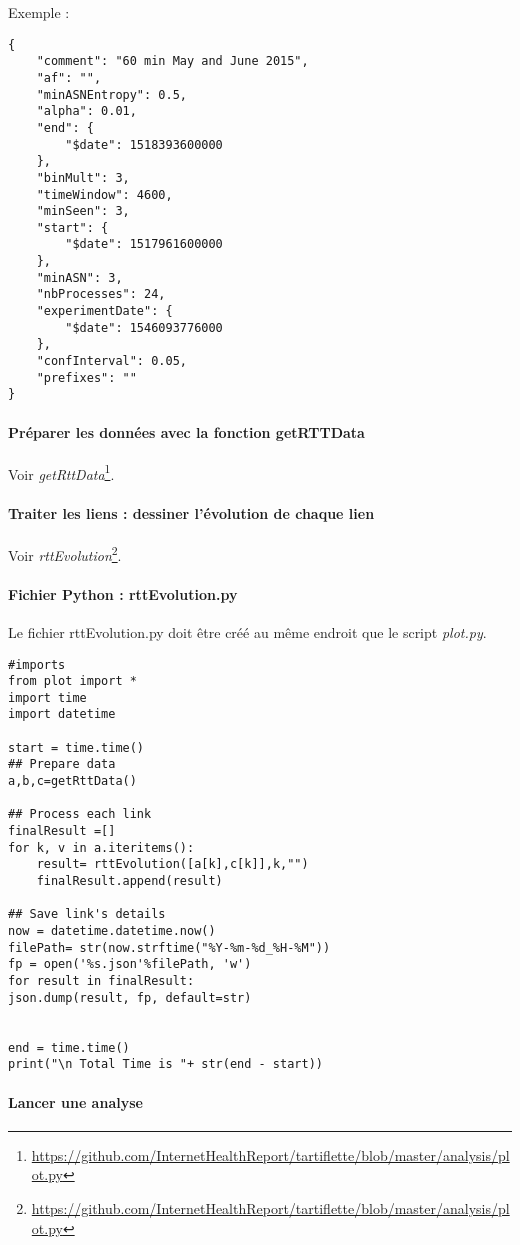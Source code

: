 \documentclass[]{report}
\begin{document}
Exemple : 

\begin{lstlisting}
{
	"comment": "60 min May and June 2015", 
	"af": "", 
	"minASNEntropy": 0.5, 
	"alpha": 0.01, 
	"end": {
		"$date": 1518393600000
	}, 
	"binMult": 3, 
	"timeWindow": 4600, 
	"minSeen": 3, 
	"start": {
		"$date": 1517961600000
	}, 
	"minASN": 3, 
	"nbProcesses": 24, 
	"experimentDate": {
		"$date": 1546093776000
	}, 
	"confInterval": 0.05,
	"prefixes": ""
}
\end{lstlisting}
\paragraph{Préparer les données avec la fonction getRTTData }
Voir  \textit{getRttData}\footnote{ \url{https://github.com/InternetHealthReport/tartiflette/blob/master/analysis/plot.py}}.
\paragraph{Traiter  les liens : dessiner l'évolution de chaque lien}
Voir  \textit{rttEvolution}\footnote{\url{https://github.com/InternetHealthReport/tartiflette/blob/master/analysis/plot.py}}.
\paragraph{Fichier Python : rttEvolution.py}

Le fichier rttEvolution.py doit être créé au même endroit que le script \textit{plot.py}.
\begin{lstlisting}
#imports 
from plot import *
import time
import datetime

start = time.time()
## Prepare data
a,b,c=getRttData()

## Process each link
finalResult =[]
for k, v in a.iteritems():
	result= rttEvolution([a[k],c[k]],k,"")
	finalResult.append(result)

## Save link's details
now = datetime.datetime.now()
filePath= str(now.strftime("%Y-%m-%d_%H-%M"))
fp = open('%s.json'%filePath, 'w') 
for result in finalResult:
json.dump(result, fp, default=str)


end = time.time()
print("\n Total Time is "+ str(end - start))
\end{lstlisting}

\paragraph{Lancer une analyse}
\end{document}
